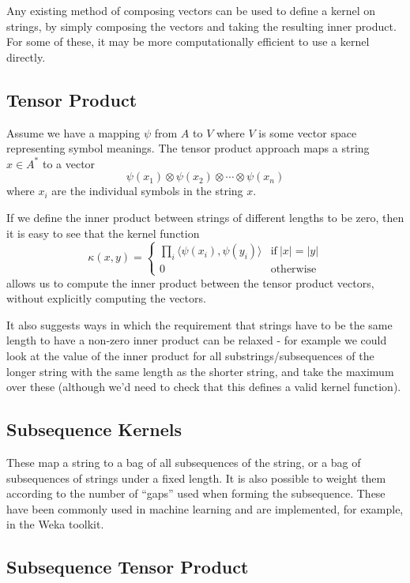\documentclass{article}
\begin{document}
Any existing method of composing vectors can be used to define a
kernel on strings, by simply composing the vectors and taking the
resulting inner product. For some of these, it may be more
computationally efficient to use a kernel directly.

\subsection{Tensor Product}

Assume we have a mapping $\psi$ from $A$ to $V$ where $V$ is some
vector space representing symbol meanings. The tensor product approach
maps a string $x \in A^*$ to a vector
$$\psi(x_1)\otimes \psi(x_2)\otimes \cdots \otimes \psi(x_n)$$
where $x_i$ are the individual symbols in the string $x$.

If we define the inner product between strings of different lengths to
be zero, then it is easy to see that the kernel function
$$\kappa(x,y) = \left\{
\begin{array}{ll}
\prod_{i}\langle \psi(x_i), \psi(y_i)\rangle & \textrm{if}\ |x| = |y|\\
0 & \textrm{otherwise}
\end{array}
\right.$$
allows us to compute the inner product between the tensor product
vectors, without explicitly computing the vectors.

It also suggests ways in which the requirement that strings have to be
the same length to have a non-zero inner product can be relaxed - for
example we could look at the value of the inner product for all
substrings/subsequences of the longer string with the same length as
the shorter string, and take the maximum over these (although we'd
need to check that this defines a valid kernel function).

\subsection{Subsequence Kernels}

These map a string to a bag of all subsequences of the string, or a bag
of subsequences of strings under a fixed length. It is also possible
to weight them according to the number of ``gaps'' used when forming
the subsequence. These have been commonly used in machine learning and
are implemented, for example, in the Weka toolkit.

\subsection{Subsequence Tensor Product}
\end{document}
